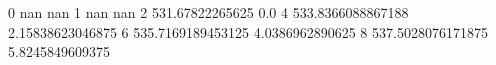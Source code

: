 0 nan nan
1 nan nan
2 531.67822265625 0.0
4 533.8366088867188 2.15838623046875
6 535.7169189453125 4.0386962890625
8 537.5028076171875 5.8245849609375
